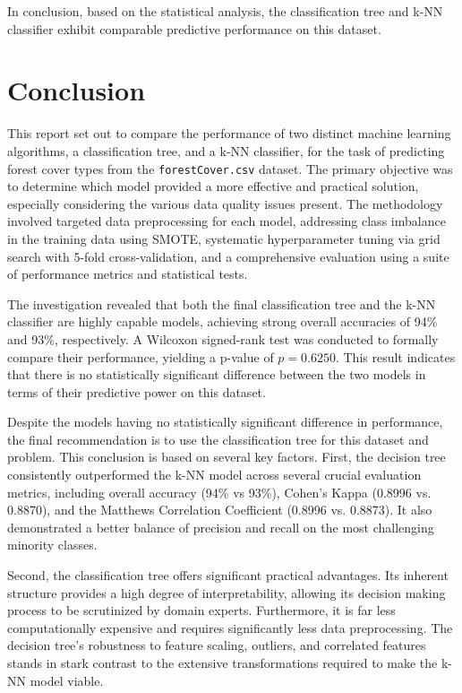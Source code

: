 \documentclass[conference]{IEEEtran}
\begin{document}
In conclusion, based on the statistical analysis, the classification tree and k-NN classifier exhibit comparable predictive performance on this dataset.

\section{\textbf{Conclusion}}

This report set out to compare the performance of two distinct machine learning algorithms, a classification tree, and a k-NN classifier, for the task of predicting forest cover types from the \texttt{forestCover.csv} dataset. The primary objective was to determine which model provided a more effective and practical solution, especially considering the various data quality issues present. The methodology involved targeted data preprocessing for each model, addressing class imbalance in the training data using SMOTE, systematic hyperparameter tuning via grid search with 5-fold cross-validation, and a comprehensive evaluation using a suite of performance metrics and statistical tests.

The investigation revealed that both the final classification tree and the k-NN classifier are highly capable models, achieving strong overall accuracies of 94\% and 93\%, respectively. A Wilcoxon signed-rank test was conducted to formally compare their performance, yielding a p-value of $p = 0.6250$. This result indicates that there is no statistically significant difference between the two models in terms of their predictive power on this dataset.

Despite the models having no statistically significant difference in performance, the final recommendation is to use the classification tree for this dataset and problem. This conclusion is based on several key factors. First, the decision tree consistently outperformed the k-NN model across several crucial evaluation metrics, including overall accuracy (94\% vs 93\%), Cohen's Kappa (0.8996 vs. 0.8870), and the Matthews Correlation Coefficient (0.8996 vs. 0.8873). It also demonstrated a better balance of precision and recall on the most challenging minority classes.

Second, the classification tree offers significant practical advantages. Its inherent structure provides a high degree of interpretability, allowing its decision making process to be scrutinized by domain experts. Furthermore, it is far less computationally expensive and requires significantly less data preprocessing. The decision tree's robustness to feature scaling, outliers, and correlated features stands in stark contrast to the extensive transformations required to make the k-NN model viable.
\end{document}
